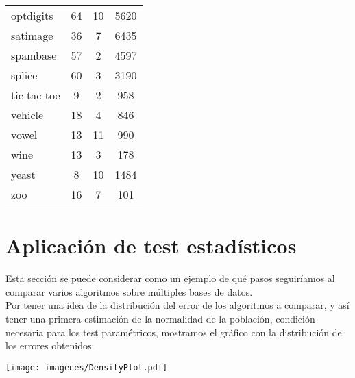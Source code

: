 \begin{table}[]
\begin{tabular}{@{}lccc@{}}
optdigits         & 64                  & 10               & 5620                 \\
satimage          & 36                  & 7                & 6435                 \\
spambase          & 57                  & 2                & 4597                 \\
splice            & 60                  & 3                & 3190                 \\
tic-tac-toe       & 9                   & 2                & 958                  \\
vehicle           & 18                  & 4                & 846                  \\
vowel             & 13                  & 11               & 990                  \\
wine              & 13                  & 3                & 178                  \\
yeast             & 8                   & 10               & 1484                 \\
zoo               & 16                  & 7                & 101                  \\ \bottomrule
\end{tabular}
\end{table}

\section{Aplicación de test estadísticos}

	Esta sección se puede considerar como un ejemplo de qué
pasos seguiríamos al comparar varios algoritmos sobre
múltiples bases de datos.\\
	Por tener una idea de la distribución del error de los 
algoritmos a comparar, y así tener una primera estimación
de la normalidad de la población, condición necesaria para
los test paramétricos, mostramos el gráfico con la 
distribución de los errores obtenidos:

\texttt{[image: imagenes/DensityPlot.pdf]}

